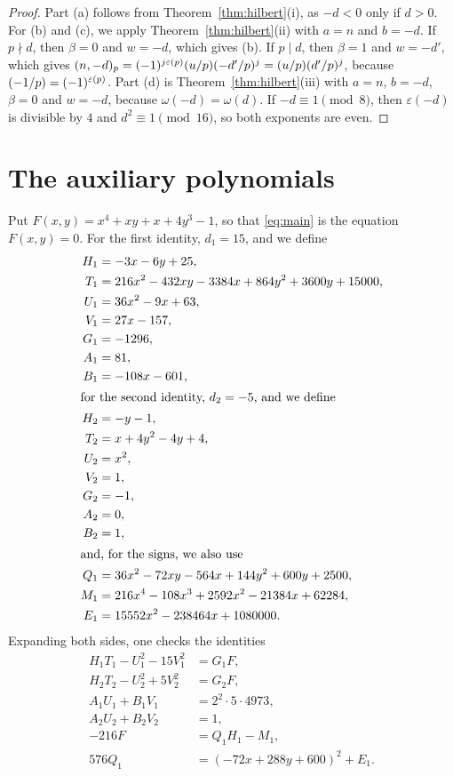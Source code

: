 \documentclass[11pt]{article}
\newcommand{\leg}[2]{\mathchoice{\biggl(\dfrac{#1}{#2}\biggr)}{(#1/#2)}{(#1/#2)}{(#1/#2)}}
\begin{document}
\begin{proof}
Part (a) follows from Theorem~\ref{thm:hilbert}(i), as $-d<0$ only if $d>0$. For (b) and (c), we apply Theorem~\ref{thm:hilbert}(ii) with $a=n$ and $b=-d$. If $p\nmid d$, then $\beta=0$ and $w=-d$, which gives (b). If $p\mid d$, then $\beta=1$ and $w=-d'$, which gives $(n,-d)_p=(-1)^{j\varepsilon(p)}\leg{u}{p}\leg{-d'}{p}^j=\leg{u}{p}\leg{d'}{p}^j$, because $\leg{-1}{p}=(-1)^{\varepsilon(p)}$. Part (d) is Theorem~\ref{thm:hilbert}(iii) with $a=n$, $b=-d$, $\beta=0$ and $w=-d$, because $\omega(-d)=\omega(d)$. If $-d\equiv1\pmod8$, then $\varepsilon(-d)$ is divisible by $4$ and $d^2\equiv1\pmod{16}$, so both exponents are even.
\end{proof}

\section{The auxiliary polynomials}

Put $F(x,y)=x^{4}+xy+x+4y^{3}-1$, so that \eqref{eq:main} is the equation $F(x,y)=0$.
For the first identity, $d_{1}=15$, and we define
\begin{align*}
H_{1}&=-3x-6y+25,\\
T_{1}&=216x^{2}-432xy-3384x+864y^{2}+3600y+15000,\\
U_{1}&=36x^{2}-9x+63,\\
V_{1}&=27x-157,\\
G_{1}&=-1296,\\
A_{1}&=81,\\
B_{1}&=-108x-601,\\
\intertext{for the second identity, $d_{2}=-5$, and we define}
H_{2}&=-y-1,\\
T_{2}&=x+4y^{2}-4y+4,\\
U_{2}&=x^{2},\\
V_{2}&=1,\\
G_{2}&=-1,\\
A_{2}&=0,\\
B_{2}&=1,\\
\intertext{and, for the signs, we also use}
Q_{1}&=36x^{2}-72xy-564x+144y^{2}+600y+2500,\\
M_{1}&=216x^{4}-108x^{3}+2592x^{2}-21384x+62284,\\
E_{1}&=15552x^{2}-238464x+1080000.
\end{align*}
Expanding both sides, one checks the identities
\begin{align}
H_{1}T_{1}-U_{1}^2-15V_{1}^2&=G_{1}F,\label{eq:norm1}\\
H_{2}T_{2}-U_{2}^2+5V_{2}^2&=G_{2}F,\label{eq:norm2}\\
A_{1}U_{1}+B_{1}V_{1}&=2^{2}\cdot 5\cdot 4973,\label{eq:bez1}\\
A_{2}U_{2}+B_{2}V_{2}&=1,\label{eq:bez2}\\
-216F&=Q_{1}H_{1}-M_{1},\label{eq:sign1}\\
576Q_{1}&=(-72x+288y+600)^2+E_{1}.\label{eq:sign1b}
\end{align}
\end{document}
